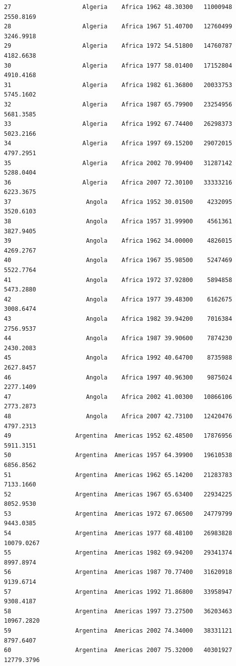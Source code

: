 \documentclass[
  letterpaper,
  DIV=11,
  numbers=noendperiod]{scrreprt}
\begin{document}
\begin{verbatim}
27                    Algeria    Africa 1962 48.30300   11000948   2550.8169
28                    Algeria    Africa 1967 51.40700   12760499   3246.9918
29                    Algeria    Africa 1972 54.51800   14760787   4182.6638
30                    Algeria    Africa 1977 58.01400   17152804   4910.4168
31                    Algeria    Africa 1982 61.36800   20033753   5745.1602
32                    Algeria    Africa 1987 65.79900   23254956   5681.3585
33                    Algeria    Africa 1992 67.74400   26298373   5023.2166
34                    Algeria    Africa 1997 69.15200   29072015   4797.2951
35                    Algeria    Africa 2002 70.99400   31287142   5288.0404
36                    Algeria    Africa 2007 72.30100   33333216   6223.3675
37                     Angola    Africa 1952 30.01500    4232095   3520.6103
38                     Angola    Africa 1957 31.99900    4561361   3827.9405
39                     Angola    Africa 1962 34.00000    4826015   4269.2767
40                     Angola    Africa 1967 35.98500    5247469   5522.7764
41                     Angola    Africa 1972 37.92800    5894858   5473.2880
42                     Angola    Africa 1977 39.48300    6162675   3008.6474
43                     Angola    Africa 1982 39.94200    7016384   2756.9537
44                     Angola    Africa 1987 39.90600    7874230   2430.2083
45                     Angola    Africa 1992 40.64700    8735988   2627.8457
46                     Angola    Africa 1997 40.96300    9875024   2277.1409
47                     Angola    Africa 2002 41.00300   10866106   2773.2873
48                     Angola    Africa 2007 42.73100   12420476   4797.2313
49                  Argentina  Americas 1952 62.48500   17876956   5911.3151
50                  Argentina  Americas 1957 64.39900   19610538   6856.8562
51                  Argentina  Americas 1962 65.14200   21283783   7133.1660
52                  Argentina  Americas 1967 65.63400   22934225   8052.9530
53                  Argentina  Americas 1972 67.06500   24779799   9443.0385
54                  Argentina  Americas 1977 68.48100   26983828  10079.0267
55                  Argentina  Americas 1982 69.94200   29341374   8997.8974
56                  Argentina  Americas 1987 70.77400   31620918   9139.6714
57                  Argentina  Americas 1992 71.86800   33958947   9308.4187
58                  Argentina  Americas 1997 73.27500   36203463  10967.2820
59                  Argentina  Americas 2002 74.34000   38331121   8797.6407
60                  Argentina  Americas 2007 75.32000   40301927  12779.3796

\end{verbatim}
\end{document}
